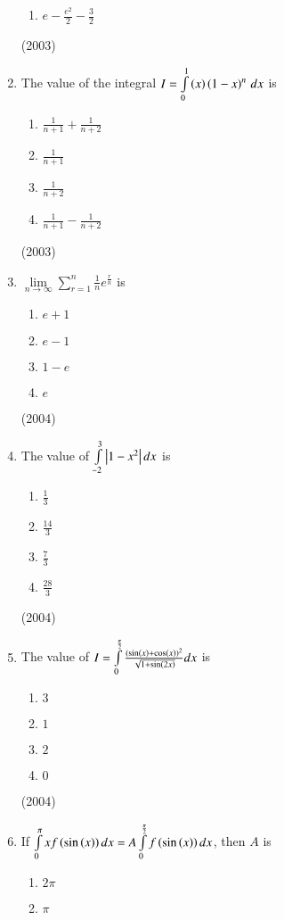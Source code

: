 \documentclass[journal]{IEEEtran}
\begin{document}
\begin{enumerate}
\begin {enumerate}
				\item $e- \frac{e^2}{2} - \frac{3}{2}$
			\end {enumerate}
			\hfill (2003)
	\item
		The value of the integral $I = \int \limits_0^1 \left(x\right)\left(1-x\right)^n \, dx$ is
			\begin{enumerate}
				\itemsep0.5em
				\item $\frac{1}{n+1} + \frac{1}{n+2}$
				\item $\frac{1}{n+1}$
				\item $\frac{1}{n+2}$
				\item $\frac{1}{n+1} - \frac{1}{n+2}$
			\end{enumerate}
			\hfill (2003)
	\item
		$\lim \limits_{n \to \infty} \sum \limits_{r=1}^{n} \frac{1}{n} e^{\frac{r}{n}}$ is
			\begin{enumerate}
				\item $e+1$
				\item $e-1$
				\item $1-e$
				\item $e$	
			\end{enumerate}
			\hfill (2004)
	\item 
		The value of $\int \limits_{-2}^{3} \left\vert1-x^2\right\vert dx$ is 
			\begin{enumerate}
				\itemsep0.4em
				\item $\frac{1}{3}$
				\item $\frac{14}{3}$
				\item $\frac{7}{3}$
				\item $\frac{28}{3}$
			\end{enumerate}
			\hfill (2004)
	\item
		The value of $I = \int \limits_0^{\frac{\pi}{2}} \frac{(\sin \left(x\right) + \cos \left(x\right))^2}{\sqrt{1+ \sin \left(2x\right)}} dx$ is
			\begin{enumerate}
				\item $3$
				\item $1$
				\item $2$
				\item $0$
			\end{enumerate}
			\hfill (2004)
	\item
		If $\int \limits_{0}^{\pi} x f\left(\sin \left(x\right)\right)dx = A \int \limits_{0}^{\frac{\pi}{2}} f\left(\sin \left(x\right)\right)dx$, then $A$ is 
			\begin{enumerate}
				\itemsep0.3em
				\item $2\pi$
				\item $\pi$

\end{enumerate}
\end{enumerate}
\end{document}
